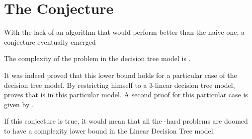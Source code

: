 \section{The Conjecture}

With the lack of an algorithm that would perform better than the naive
 one, a conjecture eventually emerged
\begin{conjecture}
The complexity of the \threeSUM problem in the decision tree model is
.
\end{conjecture}

It was indeed proved that this lower bound holds for a particular case of the
decision tree model. By restricting himself to a $3$-linear decision tree
model, \citet{erickson:1999} proves that \threeSUM is  in this
particular model. A second proof for this particular case is given by
\citet{ailon:2005}.

If this conjecture is true, it would mean that all the \threeSUM-hard
problems are doomed to have a  complexity lower bound in the
Linear Decision Tree model.
